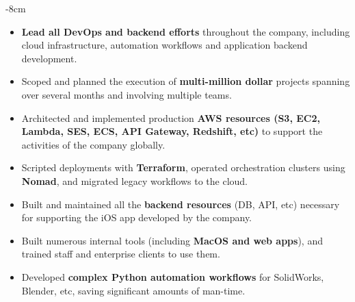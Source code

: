 \documentclass[10pt,a4paper]{altacv}
\begin{document}


\begin{adjustwidth}{}{-8cm}
\makecvheader
\end{adjustwidth}


\begin{itemize}
	\item \textbf{Lead all DevOps and backend efforts} throughout the company, including cloud infrastructure, automation workflows and application backend development.
	\item Scoped and planned the execution of \textbf{multi-million dollar} projects spanning over several months and involving multiple teams.
	\item Architected and implemented production \textbf{AWS resources (S3, EC2, Lambda, SES, ECS, API Gateway, Redshift, etc)} to support the activities of the company globally.
	\item Scripted deployments with \textbf{Terraform}, operated orchestration clusters using \textbf{Nomad}, and migrated legacy workflows to the cloud.
	\item Built and maintained all the \textbf{backend resources} (DB, API, etc) necessary for supporting the iOS app developed by the company.
	\item Built numerous internal tools (including \textbf{MacOS and web apps}), and trained staff and enterprise clients to use them.
	\item Developed \textbf{complex Python automation workflows} for SolidWorks, Blender, etc, saving significant amounts of man-time.
\end{itemize}

\divider
\end{document}
